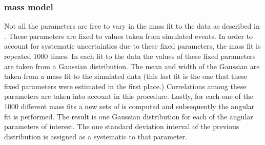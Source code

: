 \subsubsection{\mJpsiKpi mass model}
\label{systMassModel}
Not all the \pdf parameters are free to vary in the mass fit to the data as described in .
These parameters are fixed to values taken from simulated events.
In order to account for systematic uncertainties due to these fixed parameters, the mass fit is repeated 1000 times. In each fit
to the data the values of these fixed parameters are taken from a Gaussian distribution. The mean and width of the Gaussian are
taken from a mass fit to the simulated data (this last fit is the one that these fixed parameters were estimated in the first place.)
Correlations among these parameters are taken into account in this procedure. Lastly, for each one of the 1000 different mass fits
a new sets of \sWeights is computed and subsequently the angular fit is performed. The result is one Gaussian distribution
for each of the angular parameters of interest. The one standard deviation interval of the previous distribution is assigned
as a systematic to that parameter.

